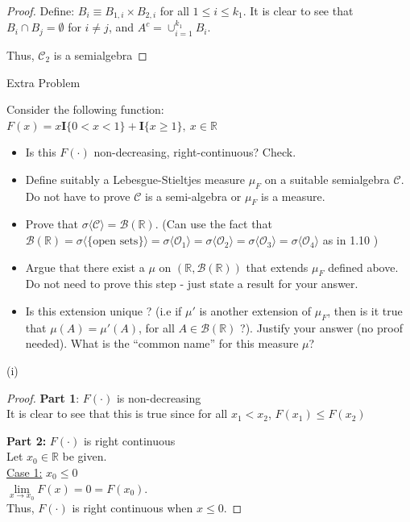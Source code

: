\documentclass[12pt,letterpaper, onecolumn]{exam}
\newcommand{\real}{\mathbb{R}}
\newcommand{\ibold}{\mathbf{I}}
\newcommand{\calO}{\mathcal{O}}
\newcommand{\calC}{\mathcal{C}}
\newcommand{\calB}{\mathcal{B}}
\begin{document}
\begin{questions}
\begin{solution}
\begin{proof}
        Define: $B_i \equiv B_{1, i} \times B_{2, i}$ for all $1 \leq i \leq k_1$. It is clear to see that $B_i \cap B_j = \emptyset$ for $i \neq j$, and $A^c = \cup_{i =1}^{k_1} B_i$.

        Thus, $\calC_2$ is a semialgebra
    \end{proof}
    \end{solution}

    \question Extra Problem 

    Consider the following function: \\
    $F(x) = x \ibold\{0 < x < 1 \} + \ibold\{x \geq 1\}, \: x \in \real$
    \begin{itemize}
        \item[(i)] Is this $F(\cdot)$ non-decreasing, right-continuous? Check.
        \item[(ii)] Define suitably a Lebesgue-Stieltjes measure $\mu_F$ on a suitable semialgebra $\calC$. Do not have to prove $\calC$ is a semi-algebra or $\mu_F$ is a measure.
        \item[(iii)] Prove that $\sigma \langle \calC\rangle =\calB(\real)$. (Can use the fact that $\calB(\real) = \sigma \langle \{\textrm{open sets}\}\rangle  = \sigma \langle \calO_1\rangle  =\sigma \langle \calO_2\rangle =\sigma \langle \calO_3\rangle  =\sigma \langle \calO_4\rangle $ as in 1.10 )
        \item[(iv)] Argue that there exist a $\mu$ on $(\real, \calB(\real))$ that extends $\mu_F$ defined above. Do not need to prove this step - just state a result for your answer.
        \item[(v)] Is this extension unique ? (i.e if $\mu'$ is another extension of $\mu_F$, then is it true that $\mu(A) = \mu'(A)$, for all $A\in \calB(\real)$ ?). Justify your answer (no proof needed). What is the “common name” for this measure $\mu$?
 
    \end{itemize}
    \begin{solution}
    (i) 
    \begin{proof}
        \textbf{Part 1}: $F(\cdot)$ is non-decreasing \\
        It is clear to see that this is true since for all $x_1 < x_2$, $F(x_1) \leq F(x_2)$

        \textbf{Part 2:} $F(\cdot)$ is right continuous \\
        Let $x_0 \in \real$ be given. \\
        \underline{Case 1:} $x_0 \leq 0$ \\
        $\lim\limits_{x \to x_0} F(x) = 0 = F(x_0).$\\
        Thus, $F(\cdot)$ is right continuous when $x \leq 0$. 


\end{proof}
\end{solution}
\end{questions}
\end{document}
